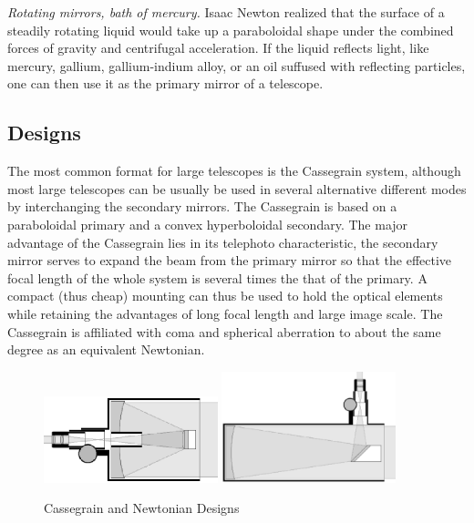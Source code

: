 \noindent
{\it Rotating mirrors, bath of mercury.} Isaac Newton realized that the surface of a steadily rotating liquid would take up a paraboloidal shape under the combined forces of gravity and
centrifugal acceleration. If the liquid reflects light, like mercury, gallium, gallium-indium alloy, or an oil suffused with reflecting particles, one can then use it as the primary mirror of a telescope. 

\subsection{Designs}

The most common format for large telescopes is the Cassegrain system, although
most large telescopes can be usually be used in several alternative 
different modes by interchanging the secondary mirrors. The Cassegrain is
based on a paraboloidal primary and a convex hyperboloidal secondary. The 
major advantage of the Cassegrain lies in its telephoto characteristic, 
the secondary mirror serves to expand the beam from the primary mirror so 
that the effective focal length of the whole system is several times the
that of the primary. A compact (thus cheap) mounting can thus be used to 
hold the optical elements while retaining the advantages of long focal length
and large image scale. The Cassegrain is affiliated with coma and spherical
aberration to about the same degree as an equivalent Newtonian.

\begin{figure}[th!]
	\centering
	\includegraphics[width=0.45\textwidth]{cassegraindetailed.eps}
	\includegraphics[width=0.45\textwidth]{newtoniandetailed.eps}
  \caption{Cassegrain and Newtonian Designs}
  \label{fig:catatropic}
\end{figure}

